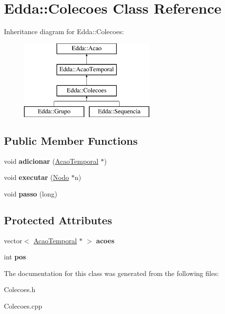 \hypertarget{class_edda_1_1_colecoes}{
\section{Edda::Colecoes Class Reference}
\label{class_edda_1_1_colecoes}
}
Inheritance diagram for Edda::Colecoes:\begin{figure}[H]
\begin{center}
\leavevmode
\includegraphics[height=4.000000cm]{class_edda_1_1_colecoes}
\end{center}
\end{figure}
\subsection*{Public Member Functions}
\begin{DoxyCompactItemize}
\item 
\hypertarget{class_edda_1_1_colecoes_a0d96c9eec71a2aba4c97e6643bbdd727}{
void {\bfseries adicionar} (\hyperlink{class_edda_1_1_acao_temporal}{AcaoTemporal} $\ast$)}
\label{class_edda_1_1_colecoes_a0d96c9eec71a2aba4c97e6643bbdd727}

\item 
\hypertarget{class_edda_1_1_colecoes_a16264ec49b8b56cb3836460bb67ad919}{
void {\bfseries executar} (\hyperlink{class_edda_1_1_nodo}{Nodo} $\ast$n)}
\label{class_edda_1_1_colecoes_a16264ec49b8b56cb3836460bb67ad919}

\item 
\hypertarget{class_edda_1_1_colecoes_a837da11bffd93be4860a68a2b297db92}{
void {\bfseries passo} (long)}
\label{class_edda_1_1_colecoes_a837da11bffd93be4860a68a2b297db92}

\end{DoxyCompactItemize}
\subsection*{Protected Attributes}
\begin{DoxyCompactItemize}
\item 
\hypertarget{class_edda_1_1_colecoes_a678033cea1724264a53b0c088f03c0f2}{
vector$<$ \hyperlink{class_edda_1_1_acao_temporal}{AcaoTemporal} $\ast$ $>$ {\bfseries acoes}}
\label{class_edda_1_1_colecoes_a678033cea1724264a53b0c088f03c0f2}

\item 
\hypertarget{class_edda_1_1_colecoes_a2544748c74e6d17195ed57f85d70666f}{
int {\bfseries pos}}
\label{class_edda_1_1_colecoes_a2544748c74e6d17195ed57f85d70666f}

\end{DoxyCompactItemize}


The documentation for this class was generated from the following files:\begin{DoxyCompactItemize}
\item 
Colecoes.h\item 
Colecoes.cpp\end{DoxyCompactItemize}
